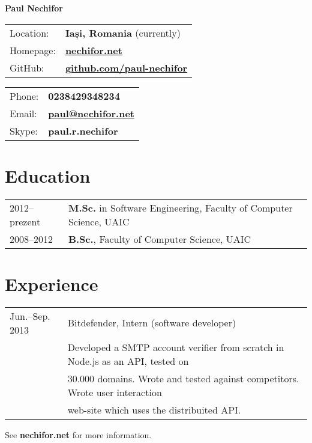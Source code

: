\documentclass[a4wide]{article}
\begin{document}
\centerline{\LARGE \bf Paul Nechifor}
\vspace{1cm}

\begin{minipage}{0.50\linewidth}
    \begin{tabular}{ll}
        Location:& {\bf Iași, Romania} (currently)\\
        Homepage:& \href{http://nechifor.net/}{\bf nechifor.net}\\
        GitHub:& \href{http://github.com/paul-nechifor}{\bf github.com/paul-nechifor}
    \end{tabular}
\end{minipage}
\begin{minipage}{0.50\linewidth}
    \begin{tabular}{ll}
        Phone:& {\bf 0238429348234}\\
        Email:& \href{mailto:paul@nechifor.net}{\bf paul@nechifor.net}\\
        Skype:& {\bf paul.r.nechifor}
    \end{tabular}
\end{minipage}


\section*{Education}

\begin{tabular}{ll}
	2012--prezent & {\bf M.Sc.} in Software Engineering, Faculty of Computer Science, UAIC \\
	2008--2012 & {\bf B.Sc.}, Faculty of Computer Science, UAIC \\
\end{tabular}

\section*{Experience}

\begin{tabular}{ll}
	Jun.--Sep. 2013&	Bitdefender, Intern (software developer)\\
	  & Developed a SMTP account verifier from scratch in Node.js as an API, tested on\\
	  & 30.000 domains. Wrote and tested against competitors. Wrote user interaction \\
      & web-site which uses the distribuited API. \\
\end{tabular}

\vspace{2cm}
\centerline{See \textbf{nechifor.net} for more information.}
\end{document}
